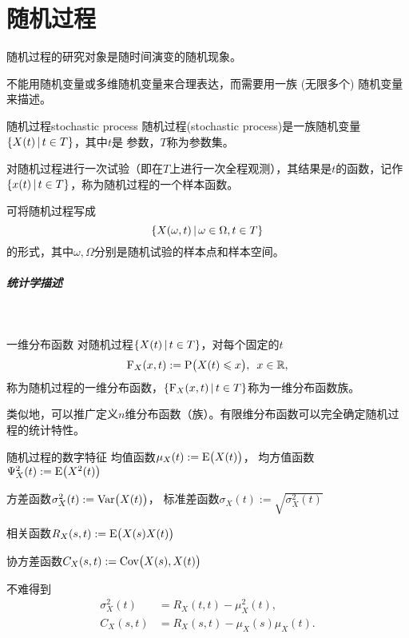 \chapter{随机过程}
随机过程的研究对象是随时间演变的随机现象。

不能用随机变量或多维随机变量来合理表达，而需要用一族 (无限多个) 随机变量来描述。
\begin{definition}{随机过程}{stochastic process}
	随机过程(stochastic process)是一族随机变量$\left\{X(t)\,\middle\vert\,t\in T\right\}$，其中$ t $是 参数，$T$称为参数集。
\end{definition}
对随机过程进行一次试验（即在$ T $上进行一次全程观测），其结果是$t$的函数，记作$\left\{x(t)\,\middle\vert\,t\in T\right\}$，称为随机过程的一个样本函数。

可将随机过程写成
\[
	\left\{X(\omega,t)\,\middle\vert\,\omega\in\Omega,t\in T\right\}
\]
的形式，其中$\omega,\Omega$分别是随机试验的样本点和样本空间。
\paragraph{统计学描述}~
\begin{definition}{一维分布函数}{}
	对随机过程$\left\{X(t)\,\middle\vert\,t\in T\right\}$，对每个固定的$t$
	\begin{equation}
		\operatorname{F}_X(x,t):=\operatorname{P}\bigl(X(t)\leqslant x\bigr),\enspace x\in\mathbb R,
	\end{equation}
	称为随机过程的一维分布函数，$\left\{\operatorname{F}_X(x,t)\,\middle\vert\,t\in T\right\}$称为一维分布函数族。
\end{definition}
类似地，可以推广定义$n$维分布函数（族）。有限维分布函数可以完全确定随机过程的统计特性。
\begin{definition}{随机过程的数字特征}{}
	均值函数$\mu_X(t):=\operatorname{E}\bigl(X(t)\bigr)$，
	均方值函数$\Psi^2_X(t):=\operatorname{E}\bigl(X^2(t)\bigr)$

	方差函数$\sigma_X^2(t):=\operatorname{Var}\bigl(X(t)\bigr)$，
	标准差函数$\sigma_X(t):=\sqrt{\sigma^2_X(t)}$

	相关函数$R_X(s,t):=\operatorname{E}\bigl(X(s)X(t)\bigr)$

	协方差函数$C_X(s,t):=\operatorname{Cov}\bigl(X(s),X(t)\bigr)$
\end{definition}
不难得到
\begin{align*}
	\sigma_X^2(t)&=R_X(t,t)-\mu_X^2(t),\\
	C_X(s,t)&=R_X(s,t)-\mu_X(s)\mu_X(t).
\end{align*}
